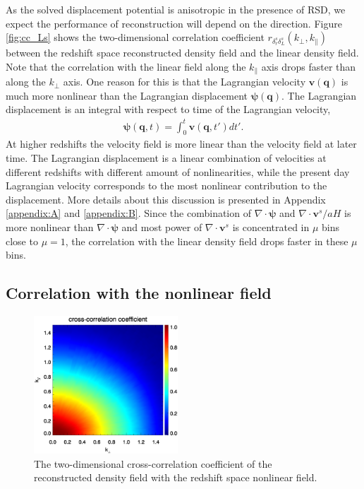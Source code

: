 \documentclass[aps,prx,twocolumn,superscriptaddress,groupedaddress,nofootinbib,amsfont]{revtex4}  %
\newcommand{\bea}{\begin{eqnarray}}
\newcommand{\eea}{\end{eqnarray}}
\newcommand{\bmp}{\bm{\psi}}
\newcommand{\bmv}{\bm{v}}
\newcommand{\bmq}{\bm{q}}
\begin{document}
As the solved displacement potential is anisotropic in the presence of RSD, we
expect the performance of reconstruction will depend on the direction.
Figure \ref{fig:cc_Ls} shows the two-dimensional correlation coefficient $r_{\delta_r^s\delta_L^s}(k_\perp, k_\parallel)$ between the redshift space reconstructed density field and the linear density field. 
Note that the correlation with the linear field along the $k_\parallel$ axis
drops faster than along the $k_\perp$ axis.
One reason for this is that the Lagrangian velocity $\bmv(\bmq)$ is much more 
nonlinear than the Lagrangian displacement $\bmp(\bmq)$. The Lagrangian 
displacement is an integral with respect to time of the Lagrangian velocity,
\bea
\bmp(\bmq,t)=\int_0^t\bmv(\bmq,t')dt'.
\eea
At higher redshifts the velocity field is more linear than the velocity field 
at later time. The Lagrangian displacement is a linear combination of velocities
at different redshifts with different amount of nonlinearities, while the 
present day Lagrangian velocity corresponds to the most nonlinear contribution
to the displacement. More details about this discussion is presented in Appendix
\ref{appendix:A} and \ref{appendix:B}.
Since the combination of $\nabla\cdot\bmp$ and $\nabla\cdot\bmv^s/aH$ is more
nonlinear than $\nabla\cdot\bmp$ and most power of $\nabla\cdot\bmv^s$ is 
concentrated in $\mu$ bins close to $\mu=1$, the correlation with the linear 
density field drops faster in these $\mu$ bins.

\subsection{Correlation with the nonlinear field}

\begin{figure}[tbp]
\begin{center}
\includegraphics[width=0.48\textwidth]{0.000anixcc_deltaRsxEs_4x.eps}
\end{center}
\vspace{-0.7cm}
\caption{The two-dimensional cross-correlation coefficient of the reconstructed
    density field with the redshift space nonlinear field.}
\label{fig:cc_Es}
\end{figure}
\end{document}
